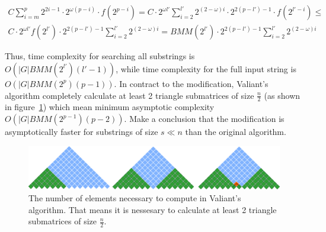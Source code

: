 \begin{equation}
\begin{array}{c}
C \sum\limits_{i=m}^p 2^{2i - 1} \cdot 2^{\omega(p - i)} \cdot f(2^{p - i}) =
C \cdot 2^{\omega l'}\sum\limits_{i=2}^{l'} 2^{(2 - \omega)i} \cdot 2^{2(p - l') - 1} \cdot f(2^{l' - i}) \le \\
C \cdot 2^{\omega l'} f(2^{l'}) \cdot 2^{2(p - l') - 1} \sum\limits_{i=2}^{l'} 2^{(2 - \omega)i} =
BMM(2^{l'}) \cdot 2^{2(p - l') - 1} \sum\limits_{i=2}^{l'} 2^{(2 - \omega)i}
\end{array}
\end{equation}

Thus, time complexity for searching all substrings is  $O(|G|BMM(2^{l'})(l' - 1))$, while time complexity for the full input string is $O(|G|BMM(2^p)(p - 1))$. In contract to the modification, Valiant's algorithm completely calculate at least 2 triangle submatrices of size $\frac{n}{2}$ (as shown in figure~\ref{fig5}) which mean minimum asymptotic complexity  $O(|G|BMM(2^{p - 1})(p - 2))$. Make a conclusion that the modification is asymptotically faster for substrings of size $s \ll n$  than the original algorithm.

\begin{figure}[h]
\vspace{3mm}
 \begin{center}
 \includegraphics[width=12cm]{pictures/valsubstring.pdf}
    \caption{The number of elements necessary to compute in Valiant's algorithm. That means it is nessesary to calculate at least 2 triangle submatrices of size $\frac{n}{2}$.}
    \label{fig5}
 \end{center}
\vspace{-8mm}
\end{figure}
